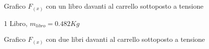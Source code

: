 \documentclass[a4paper]{article}
\theoremstyle{definition}
\begin{document}
\begin{figure}[!ht]
	\captionsetup{labelformat=empty}
	\caption{Grafico \(F_{(x)}\) con un libro davanti al carrello sottoposto a tensione}
	
\end{figure}

\begin{figure}[!htbp]
	\captionsetup{labelformat=empty}
	\caption{1 Libro, \(m_{libro} = 0.482 Kg\)}
\end{figure}

\begin{figure}[!ht]
	\captionsetup{labelformat=empty}
	\caption{Grafico \(F_{(x)}\) con due libri davanti al carrello sottoposto a tensione}
	
\end{figure}
\end{document}
